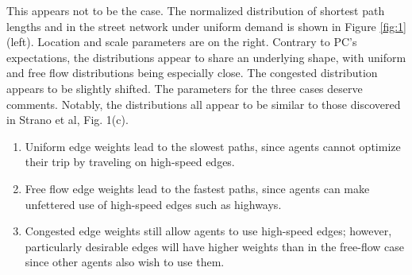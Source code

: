 \documentclass[english]{scrartcl}
\begin{document}
			This appears not to be the case. The normalized distribution of shortest path lengths and in the street network under uniform demand is shown in Figure \ref{fig:1} (left). Location and scale parameters are on the right. Contrary to PC's expectations, the distributions appear to share an underlying shape, with uniform and free flow distributions being especially close. The congested distribution appears to be slightly shifted. The parameters for the three cases deserve comments. Notably, the distributions all appear to be similar to those discovered in Strano et al, Fig. 1(c). 
			\begin{enumerate}
			 	\item Uniform edge weights lead to the slowest paths, since agents cannot optimize their trip by traveling on high-speed edges. 
			 	\item Free flow edge weights lead to the fastest paths, since agents can make unfettered use of high-speed edges such as highways. 
			 	\item Congested edge weights still allow agents to use high-speed edges; however, particularly desirable edges will have higher weights than in the free-flow case since other agents also wish to use them. 
			\end{enumerate} 
\end{document}
